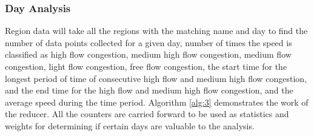 \documentclass[titlepage,twocolumn]{article}
\begin{document}
\subsubsection{Day Analysis}

\par Region data will take all the regions with the matching name and day to find the number of data points collected for a given day, number of times the speed is classified as high flow congestion, medium high flow congestion, medium flow congestion, light flow congestion, free flow congestion, the start time for the longest period of time of consecutive high flow and medium high flow congestion, and the end time for the high flow and medium high flow congestion, and the average speed during the time period. Algorithm \ref{alg:3} demonstrates the work of the reducer. All the counters are carried forward to be used as statistics and weights for determining if certain days are valuable to the analysis.
\end{document}
